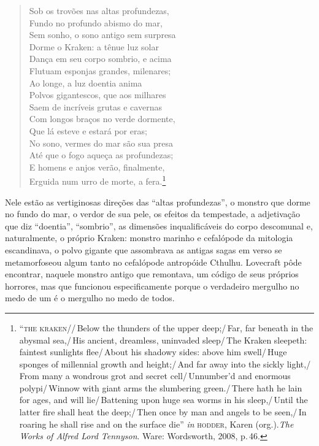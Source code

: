 \begin{quote}\noindent
Sob os trovões nas altas profundezas,\\
Fundo no profundo abismo do mar,\\
Sem sonho, o sono antigo sem surpresa\\
Dorme o Kraken: a tênue luz solar\\
Dança em seu corpo sombrio, e acima\\
Flutuam esponjas grandes, milenares;\\
Ao longe, a luz doentia anima\\
Polvos gigantescos, que aos milhares\\
Saem de incríveis grutas e cavernas\\
Com longos braços no verde dormente,\\
Que lá esteve e estará por eras;\\
No sono, vermes do mar são sua presa\\
Até que o fogo aqueça as profundezas;\\
E homens e anjos verão, finalmente,\\
Erguida num urro de morte, a fera.\footnote{``\textsc{the kraken}//\,Below the
  thunders of the upper deep;/\,Far, far beneath in the abysmal sea,/\,His
  ancient, dreamless, uninvaded sleep/\,The Kraken sleepeth: faintest
  sunlights flee/\,About his shadowy sides: above him swell/\,Huge sponges
  of millennial growth and height;/\,And far away into the sickly
  light,/\,From many a wondrous grot and secret cell/\,Unnumber'd and
  enormous polypi/\,Winnow with giant arms the slumbering green./\,There
  hath he lain for ages, and will lie/\,Battening upon huge sea worms in
  his sleep,/\,Until the latter fire shall heat the deep;/\,Then once by man
  and angels to be seen,/\,In roaring he shall rise and on the surface
  die'' \emph{in} \textsc{hodder}, Karen (org.).\emph{The Works of Alfred Lord Tennyson}. Ware: Wordsworth, 2008, p.\,46.}
\end{quote}

Nele estão as vertiginosas direções das ``altas profundezas'', o monstro
que dorme no fundo do mar, o verdor de sua pele, os efeitos da
tempestade, a adjetivação que diz ``doentia'', ``sombrio'', as dimensões
inqualificáveis do corpo descomunal e, naturalmente, o próprio Kraken:
monstro marinho e cefalópode da mitologia escandinava, o polvo gigante
que assombrava as antigas sagas em verso se metamorfoseou algum tanto no
cefalópode antropóide Cthulhu. Lovecraft pôde encontrar, naquele monstro
antigo que remontava, um código de seus próprios horrores, mas que
funcionou especificamente porque o verdadeiro mergulho no medo de um é o
mergulho no medo de todos.

